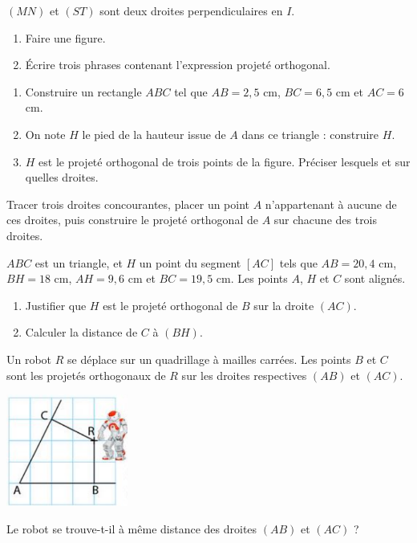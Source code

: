\documentclass[a4paper]{article}
\begin{document}
\bigskip

\exo $(MN)$ et $(ST)$ sont deux droites perpendiculaires en $I$.
\begin{enumerate}
  \item Faire une figure.
  \item Écrire trois phrases contenant l'expression \og{}projeté orthogonal\fg{}.
\end{enumerate}

\bigskip

\exo \vspace{-2mm}
\begin{enumerate}
  \item Construire un rectangle $ABC$ tel que $AB=2,5$ cm, $BC=6,5$ cm et $AC=6$ cm.
  \item On note $H$ le pied de la hauteur issue de $A$ dans ce triangle : construire $H$.
  \item $H$ est le projeté orthogonal de trois points de la figure. Préciser lesquels et sur quelles droites.
\end{enumerate}

\bigskip

\exo Tracer trois droites concourantes, placer un point $A$ n'appartenant à aucune de ces droites, puis construire le projeté orthogonal de $A$ sur chacune des trois droites.

\bigskip

\exo $ABC$ est un triangle, et $H$ un point du segment $[AC]$ tels que $AB=20,4$ cm, $BH=18$ cm, $AH=9,6$ cm et $BC=19,5$ cm. Les points $A$, $H$ et $C$ sont alignés.
\begin{enumerate}
  \item Justifier que $H$ est le projeté orthogonal de $B$ sur la droite $(AC)$.
  \item Calculer la distance de $C$ à $(BH)$.
\end{enumerate}

\bigskip

\exo Un robot $R$ se déplace sur un quadrillage à mailles carrées. Les points $B$ et $C$ sont les projetés orthogonaux de $R$ sur les droites respectives $(AB)$ et $(AC)$.

\begin{center}
  \includegraphics[width=4cm]{9_1_robot.png}
\end{center}

Le robot se trouve-t-il à même distance des droites $(AB)$ et $(AC)$ ?
\end{document}
